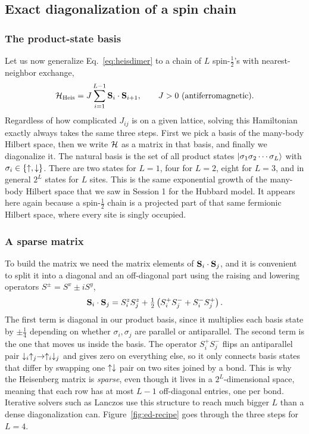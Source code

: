 \documentclass[lecture_notes.tex]{subfiles}
\begin{document}
\subsection{Exact diagonalization of a spin chain}
\label{sec:ed}
\subsubsection{The product-state basis}
Let us now generalize Eq.~\eqref{eq:heisdimer} to a chain of $L$ spin-$\tfrac12$'s with
nearest-neighbor exchange,
\begin{equation}
  \mathcal{H}_{\mathrm{Heis}} = J\sum_{i=1}^{L-1} \vb S_i\cdot\vb S_{i+1}, \qquad J>0
  \ \text{(antiferromagnetic).}
  \label{eq:heisenberg}
\end{equation}
Regardless of how complicated $J_{ij}$ is on a given lattice, solving this Hamiltonian exactly always
takes the same three steps. First we pick a basis of the many-body Hilbert space, then we write
$\mathcal{H}$ as a matrix in that basis, and finally we diagonalize it. The natural basis is the set of all
product states $\ket{\sigma_1\sigma_2\cdots\sigma_L}$ with $\sigma_i\in\{\uparrow,\downarrow\}$. There are two
states for $L=1$, four for $L=2$, eight for $L=3$, and in general $2^L$ states for $L$ sites. This is
the same exponential growth of the many-body Hilbert space that we saw in Session 1 for the Hubbard
model. It appears here again because a spin-$\tfrac12$ chain is a projected part of that same
fermionic Hilbert space, where every site is singly occupied.

\subsubsection{A sparse matrix}
To build the matrix we need the matrix elements of $\vb S_i\cdot\vb S_j$, and it is convenient to
split it into a diagonal and an off-diagonal part using the raising and lowering operators
$S^\pm = S^x\pm iS^y$,
\begin{equation}
  \vb S_i\cdot\vb S_j = S_i^zS_j^z + \tfrac12\left(S_i^+S_j^- + S_i^-S_j^+\right).
  \label{eq:sdots}
\end{equation}
The first term is diagonal in our product basis, since it multiplies each basis state by
$\pm\tfrac14$ depending on whether $\sigma_i,\sigma_j$ are parallel or antiparallel. The second term
is the one that moves us inside the basis. The operator $S_i^+S_j^-$ flips an antiparallel pair
$\downarrow_i\uparrow_j\to\uparrow_i\downarrow_j$ and gives zero on everything else, so it only connects basis states that
differ by swapping one $\uparrow\downarrow$ pair on two sites joined by a bond. This is why the Heisenberg
matrix is \emph{sparse}, even though it lives in a $2^L$-dimensional space, meaning that each row
has at most $L-1$ off-diagonal entries, one per bond. Iterative solvers such as Lanczos use this
structure to reach much bigger $L$ than a dense diagonalization can.
Figure~\ref{fig:ed-recipe} goes through the three steps for $L=4$.
\end{document}
